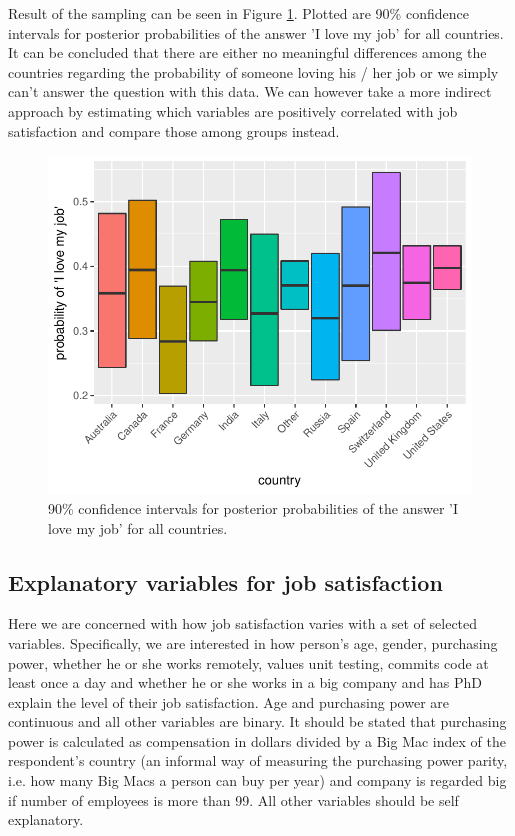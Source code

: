 \documentclass{article}
\begin{document}
Result of the sampling can be seen in Figure \ref{fig_2}. Plotted are 90\% confidence intervals for posterior probabilities of the answer 'I love my job' for all countries. It can be concluded that there are either no meaningful differences among the countries regarding the probability of someone loving his / her job or we simply can't answer the question with this data. We can however take a more indirect approach by estimating which variables are positively correlated with job satisfaction and compare those among groups instead.


\begin{figure}[H]
\centering
\includegraphics{report-012}
\caption{90\% confidence intervals for posterior probabilities of the answer 'I love my job' for all countries.}\label{fig_2}
\end{figure}

\subsection{Explanatory variables for job satisfaction}
Here we are concerned with how job satisfaction varies with a set of selected variables. Specifically, we are interested in how person's age, gender, purchasing power, whether he or she works remotely, values unit testing, commits code at least once a day and whether he or she works in a big company and has PhD explain the level of their job satisfaction. Age and purchasing power are continuous and all other variables are binary. It should be stated that purchasing power is calculated as compensation in dollars divided by a Big Mac index of the respondent's country (an informal way of measuring the purchasing power parity, i.e. how many Big Macs a person can buy per year) and company is regarded big if number of employees is more than 99. All other variables should be self explanatory.
\end{document}

